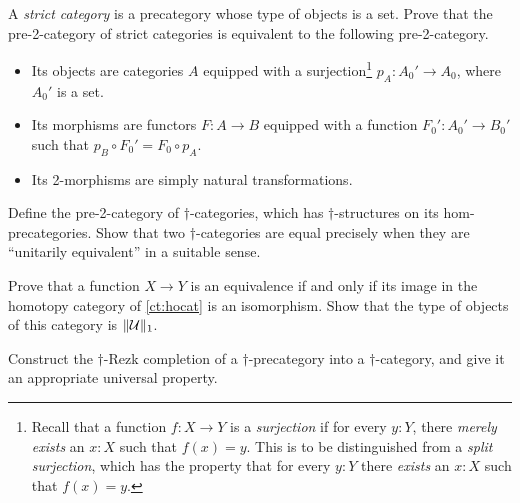 \begin{ex}
  A \emph{strict category} is a precategory whose type of objects is a set.
  Prove that the pre-2-category of strict categories is equivalent to the following pre-2-category.
  \begin{itemize}
  \item Its objects are categories $A$ equipped with a surjection\footnote{Recall that a function $f:X\to Y$ is a \emph{surjection} if for every $y:Y$, there \emph{merely exists} an $x:X$ such that $f(x)=y$.  This is to be distinguished from a \emph{split surjection}, which has the property that for every $y:Y$ there \emph{exists} an $x:X$ such that $f(x)=y$.} $p_A:A_0'\to A_0$, where $A_0'$ is a set.
  \item Its morphisms are functors $F:A\to B$ equipped with a function $F_0':A_0' \to B_0'$ such that $p_B \circ F_0' = F_0 \circ p_A$.
  \item Its 2-morphisms are simply natural transformations.
  \end{itemize}
\end{ex}

\begin{ex}
  Define the pre-2-category of $\dagger$-categories, which has $\dagger$-structures on its hom-precategories.
  Show that two $\dagger$-categories are equal precisely when they are ``unitarily equivalent'' in a suitable sense.
\end{ex}

\begin{ex}\label{ct:ex:hocat}
  Prove that a function $X\to Y$ is an equivalence if and only if its image in the homotopy category of \autoref{ct:hocat} is an isomorphism.
  Show that the type of objects of this category is $\Vert \mathcal{U}\Vert_{1}$.
\end{ex}

\begin{ex}
  Construct the $\dagger$-Rezk completion of a $\dagger$-precategory into a $\dagger$-category, and give it an appropriate universal property.
\end{ex}



